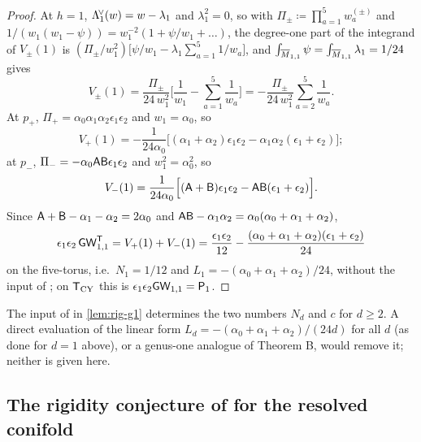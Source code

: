 \begin{proof}
At $h=1$, $\Lambda^{\!\vee}_1(w)=w-\lambda_1$ and $\lambda_1^2=0$, so with $\Pi_\pm\coloneqq\prod_{a=1}^5w^{(\pm)}_a$ and $1/(w_1(w_1-\psi))=w_1^{-2}(1+\psi/w_1+\dots)$, the degree-one part of the integrand of $V_\pm(1)$ is $(\Pi_\pm/w_1^2)\big[\psi/w_1-\lambda_1\sum_{a=1}^5 1/w_a\big]$, and $\int_{\overline{M}_{1,1}}\psi=\int_{\overline{M}_{1,1}}\lambda_1=1/24$ gives
\[
V_\pm(1)=\frac{\Pi_\pm}{24\,w_1^2}\Big[\frac{1}{w_1}-\sum_{a=1}^{5}\frac{1}{w_a}\Big]=-\frac{\Pi_\pm}{24\,w_1^2}\sum_{a=2}^{5}\frac{1}{w_a}.
\]
At $p_+$, $\Pi_+=\alpha_0\alpha_1\alpha_2\epsilon_1\epsilon_2$ and $w_1=\alpha_0$, so
\[
V_+(1)=-\frac{1}{24\alpha_0}\Big[(\alpha_1+\alpha_2)\epsilon_1\epsilon_2-\alpha_1\alpha_2(\epsilon_1+\epsilon_2)\Big];
\]
at $p_-$, $\Pi_-=-\alpha_0\mathsf{A}\mathsf{B}\epsilon_1\epsilon_2$ and $w_1^2=\alpha_0^2$, so
\[
V_-(1)=\frac{1}{24\alpha_0}\Big[(\mathsf{A}+\mathsf{B})\epsilon_1\epsilon_2-\mathsf{A}\mathsf{B}(\epsilon_1+\epsilon_2)\Big].
\]
Since $\mathsf{A}+\mathsf{B}-\alpha_1-\alpha_2=2\alpha_0$ and $\mathsf{A}\mathsf{B}-\alpha_1\alpha_2=\alpha_0(\alpha_0+\alpha_1+\alpha_2)$,
\[
\epsilon_1\epsilon_2\,\mathsf{GW}^{\mathsf{T}}_{1,1}=V_+(1)+V_-(1)=\frac{\epsilon_1\epsilon_2}{12}-\frac{(\alpha_0+\alpha_1+\alpha_2)(\epsilon_1+\epsilon_2)}{24}
\]
on the five-torus, i.e.\ $N_1=1/12$ and $L_1=-(\alpha_0+\alpha_1+\alpha_2)/24$, without the input of \cite{BS}; on $\mathsf{T}_{\mathrm{CY}}$ this is $\epsilon_1\epsilon_2\mathsf{GW}_{1,1}=\mathsf{P}_{1}$.
\end{proof}

\begin{rmk}
\label{rmk:rig-g1input}
The input of \cite{BS} in \cref{lem:rig-g1} determines the two numbers $N_d$ and $c$ for $d\geq 2$. A direct evaluation of the linear form $L_d=-(\alpha_0+\alpha_1+\alpha_2)/(24d)$ for all $d$ (as done for $d=1$ above), or a genus-one analogue of Theorem B, would remove it; neither is given here.
\end{rmk}

\subsection{The rigidity conjecture of \texorpdfstring{\cite{BS}}{[BS]} for the resolved conifold}

